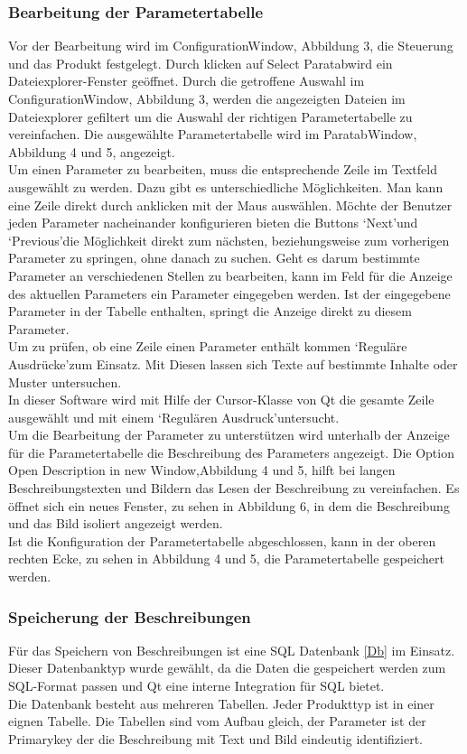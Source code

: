 \documentclass[12pt,a4paper]{article}
\begin{document}
\subsubsection{Bearbeitung der Parametertabelle}
Vor der Bearbeitung wird im ConfigurationWindow, Abbildung 3, die Steuerung und das Produkt festgelegt. Durch klicken auf \glqq Select Paratab\grqq\space wird ein Dateiexplorer-Fenster geöffnet. Durch die getroffene Auswahl im ConfigurationWindow, Abbildung 3, werden die angezeigten Dateien im Dateiexplorer gefiltert um die Auswahl der richtigen Parametertabelle zu vereinfachen. Die ausgewählte Parametertabelle wird im ParatabWindow, Abbildung 4 und 5, angezeigt.\\
Um einen Parameter zu bearbeiten, muss die entsprechende Zeile im Textfeld ausgewählt zu werden. Dazu gibt es unterschiedliche Möglichkeiten. Man kann eine Zeile direkt durch anklicken mit der Maus auswählen. Möchte der Benutzer jeden Parameter nacheinander konfigurieren bieten die Buttons \lq Next\rq\space und \lq Previous\rq\space die Möglichkeit direkt zum nächsten, beziehungsweise zum vorherigen Parameter zu springen, ohne danach zu suchen. Geht es darum bestimmte Parameter an verschiedenen Stellen zu bearbeiten, kann im Feld für die Anzeige des aktuellen Parameters ein Parameter eingegeben werden. Ist der eingegebene Parameter in der Tabelle enthalten, springt die Anzeige direkt zu diesem Parameter.\\
Um zu prüfen, ob eine Zeile einen Parameter enthält kommen \lq Reguläre Ausdrücke\rq\space zum Einsatz. Mit Diesen lassen sich Texte auf bestimmte Inhalte oder Muster untersuchen. \\
In dieser Software wird mit Hilfe der Cursor-Klasse von Qt die gesamte Zeile ausgewählt und mit einem \lq Regulären Ausdruck\rq\space untersucht. \\
Um die Bearbeitung der Parameter zu unterstützen wird unterhalb der Anzeige für die Parametertabelle die Beschreibung des Parameters angezeigt. Die Option \glqq Open Description in new Window\grqq ,\space Abbildung 4 und 5, hilft bei langen Beschreibungstexten und Bildern das Lesen der Beschreibung zu vereinfachen. Es öffnet sich ein neues Fenster, zu sehen in Abbildung 6, in dem die Beschreibung und das Bild isoliert angezeigt werden.\\
Ist die Konfiguration der Parametertabelle abgeschlossen, kann in der oberen rechten Ecke, zu sehen in Abbildung 4 und 5, die Parametertabelle gespeichert werden. 
\subsubsection{Speicherung der Beschreibungen}
Für das Speichern von Beschreibungen ist eine SQL Datenbank \ref{Db} im Einsatz. Dieser Datenbanktyp wurde gewählt, da die Daten die gespeichert werden zum SQL-Format passen und Qt eine interne Integration für SQL bietet.\\
Die Datenbank besteht aus mehreren Tabellen. Jeder Produkttyp ist in einer eignen Tabelle. Die Tabellen sind vom Aufbau gleich, der Parameter ist der Primarykey der die Beschreibung mit Text und Bild eindeutig identifiziert.
\end{document}
